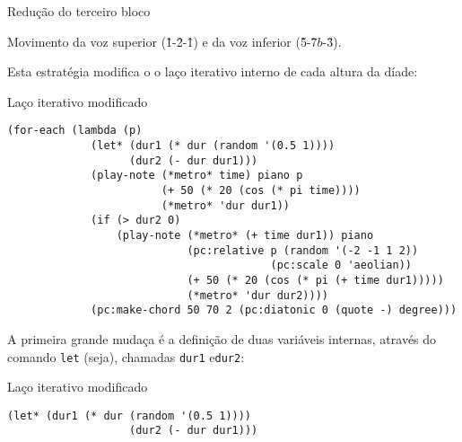 \begin{example}{Redução do terceiro bloco}\label{fig:neumaMD3}



Movimento da voz superior (\^1-\^2-\^1) e da voz inferior (\^5-\^7$b$-\^3).
  
  \centering{}
\end{example}

Esta estratégia modifica o o laço iterativo interno de cada altura da díade:

\begin{example}{Laço iterativo modificado}
\begin{verbatim}
(for-each (lambda (p)
             (let* (dur1 (* dur (random '(0.5 1))))
                   (dur2 (- dur dur1)))
             (play-note (*metro* time) piano p
                        (+ 50 (* 20 (cos (* pi time))))
                        (*metro* 'dur dur1))
             (if (> dur2 0)
                 (play-note (*metro* (+ time dur1)) piano
                            (pc:relative p (random '(-2 -1 1 2))
                                         (pc:scale 0 'aeolian))
                            (+ 50 (* 20 (cos (* pi (+ time dur1)))))
                            (*metro* 'dur dur2))))
             (pc:make-chord 50 70 2 (pc:diatonic 0 (quote -) degree)))
\end{verbatim}
\end{example}

A primeira grande mudaça é a definição de duas variáveis internas, através do comando \verb|let| (seja), chamadas \verb|dur1| e\verb|dur2|:

\begin{example}{Laço iterativo modificado}
\begin{verbatim}
(let* (dur1 (* dur (random '(0.5 1))))
                   (dur2 (- dur dur1)))
\end{verbatim}
\end{example}

